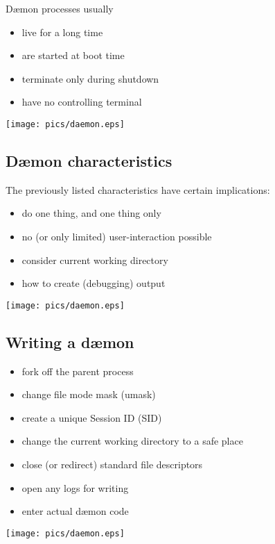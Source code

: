 \documentclass[xga]{xdvislides}
\begin{document}
D\ae mon processes usually
\begin{itemize}
	\item live for a long time
	\item are started at boot time
	\item terminate only during shutdown
	\item have no controlling terminal
\end{itemize}

\vfill
\hfill\texttt{[image: pics/daemon.eps]} \\

\subsection{D\ae mon characteristics}
The previously listed characteristics have certain implications:
\\

\begin{itemize}
	\item do one thing, and one thing only
	\item no (or only limited) user-interaction possible
	\item consider current working directory
	\item how to create (debugging) output
\end{itemize}

\vfill
\hfill\texttt{[image: pics/daemon.eps]} \\

\subsection{Writing a d\ae mon}
\begin{itemize}
	\item fork off the parent process
	\item change file mode mask (umask)
	\item create a unique Session ID (SID)
	\item change the current working directory to a safe place
	\item close (or redirect) standard file descriptors
	\item open any logs for writing
	\item enter actual d\ae mon code
\end{itemize}

\vfill
\hfill\texttt{[image: pics/daemon.eps]} \\
\end{document}
